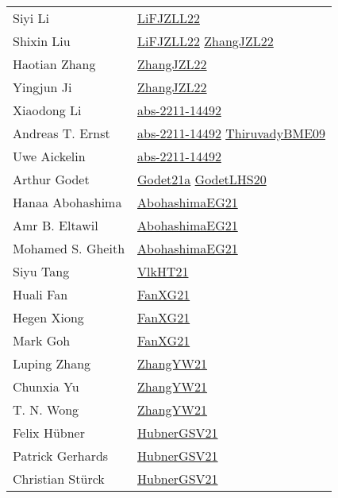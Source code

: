 {\begin{longtable}{p{4cm}p{15cm}}
Siyi Li & \href{papers/LiFJZLL22.pdf}{LiFJZLL22}\cite{LiFJZLL22} \\
Shixin Liu & \href{papers/LiFJZLL22.pdf}{LiFJZLL22}\cite{LiFJZLL22} \href{papers/ZhangJZL22.pdf}{ZhangJZL22}\cite{ZhangJZL22} \\
Haotian Zhang & \href{papers/ZhangJZL22.pdf}{ZhangJZL22}\cite{ZhangJZL22} \\
Yingjun Ji & \href{papers/ZhangJZL22.pdf}{ZhangJZL22}\cite{ZhangJZL22} \\
Xiaodong Li & \href{articles/abs-2211-14492.pdf}{abs-2211-14492}\cite{abs-2211-14492} \\
Andreas T. Ernst & \href{articles/abs-2211-14492.pdf}{abs-2211-14492}\cite{abs-2211-14492} \href{papers/ThiruvadyBME09.pdf}{ThiruvadyBME09}\cite{ThiruvadyBME09} \\
Uwe Aickelin & \href{articles/abs-2211-14492.pdf}{abs-2211-14492}\cite{abs-2211-14492} \\
Arthur Godet & \href{}{Godet21a}\cite{Godet21a} \href{papers/GodetLHS20.pdf}{GodetLHS20}\cite{GodetLHS20} \\
Hanaa Abohashima & \href{articles/AbohashimaEG21.pdf}{AbohashimaEG21}\cite{AbohashimaEG21} \\
Amr B. Eltawil & \href{articles/AbohashimaEG21.pdf}{AbohashimaEG21}\cite{AbohashimaEG21} \\
Mohamed S. Gheith & \href{articles/AbohashimaEG21.pdf}{AbohashimaEG21}\cite{AbohashimaEG21} \\
Siyu Tang & \href{articles/VlkHT21.pdf}{VlkHT21}\cite{VlkHT21} \\
Huali Fan & \href{articles/FanXG21.pdf}{FanXG21}\cite{FanXG21} \\
Hegen Xiong & \href{articles/FanXG21.pdf}{FanXG21}\cite{FanXG21} \\
Mark Goh & \href{articles/FanXG21.pdf}{FanXG21}\cite{FanXG21} \\
Luping Zhang & \href{articles/ZhangYW21.pdf}{ZhangYW21}\cite{ZhangYW21} \\
Chunxia Yu & \href{articles/ZhangYW21.pdf}{ZhangYW21}\cite{ZhangYW21} \\
T. N. Wong & \href{articles/ZhangYW21.pdf}{ZhangYW21}\cite{ZhangYW21} \\
Felix H{\"{u}}bner & \href{articles/HubnerGSV21.pdf}{HubnerGSV21}\cite{HubnerGSV21} \\
Patrick Gerhards & \href{articles/HubnerGSV21.pdf}{HubnerGSV21}\cite{HubnerGSV21} \\
Christian St{\"{u}}rck & \href{articles/HubnerGSV21.pdf}{HubnerGSV21}\cite{HubnerGSV21} \\

\end{longtable}}

